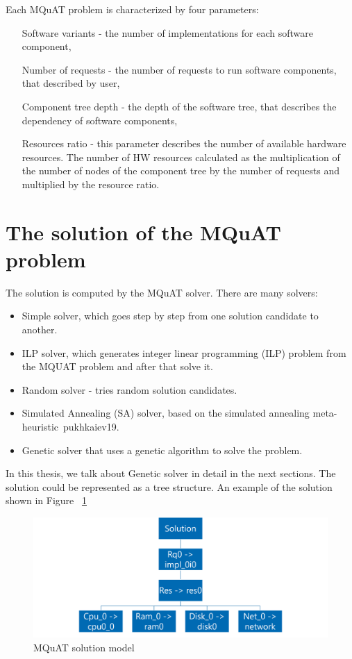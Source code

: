 Each MQuAT problem is characterized by four parameters:

\begin{itemize}
	\item[Software variants] - the number of implementations for each software component,
	\item[Number of requests] - the number of requests to run software components, that described by user, 
	\item[Component tree depth] - the depth of the software tree, that describes the dependency of software components,
	\item[Resources ratio] - this parameter describes the number of available hardware resources. The number of HW resources calculated as the multiplication of the number of nodes of the component tree by the number of requests and multiplied by the resource ratio.
\end{itemize}

\section{The solution of the MQuAT problem}

The solution is computed by the MQuAT solver. There are many solvers:

\begin{itemize}
	\item Simple solver, which goes step by step from one solution candidate to another.
	\item ILP solver, which generates integer linear programming (ILP) problem from the MQUAT problem and after that solve it.
	\item Random solver - tries random solution candidates.
	\item Simulated Annealing (SA) solver, based on the simulated annealing meta-heuristic~{pukhkaiev19}.
	\item Genetic solver that uses a genetic algorithm to solve the problem.
\end{itemize}

In this thesis, we talk about Genetic solver in detail in the next sections.
The solution could be represented as a tree structure. An example of the solution shown in Figure ~\ref{fig:SolutionModel}

\begin{figure}
	\centering
	\includegraphics[width=\textwidth]{images/MQuATSolutionModel.png}
	\caption[MQuAT solution model]{MQuAT solution model}
	\label{fig:SolutionModel}
\end{figure}

